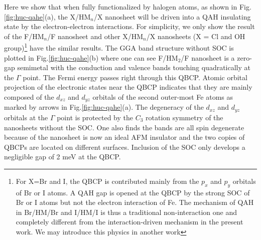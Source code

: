 \documentclass[twocolumn,english,prb,showpacs]{revtex4-1}
\begin{document}
Here we show that when fully functionalized by halogen atoms, as shown in Fig.\ref{fig:huc-qahe}(a), the {X/HM$_n$/X} nanosheet will be driven into a QAH insulating state by the electron-electron interactions. For simplicity, we only show the result of the F/HM$_n$/F nanosheet and other X/HM$_{n}$/X nanosheets (X = Cl and OH group)\footnote{For X=Br and I, the QBCP is contributed mainly from the $p_x$ and $p_y$ orbitals of Br or I atoms. A QAH gap is opened at the QBCP by the strong SOC of Br or I atoms but not the electron interaction of Fe. The mechanism of QAH in Br/HM/Br and I/HM/I is thus a traditional non-interaction one and completely different from the interaction-driven mechanism in the present work. We may introduce this physics in another work} {have the similar results}. The GGA band structure without SOC is plotted in Fig.\ref{fig:huc-qahe}(b) where one can see F/HM$_2$/F nanosheet is a zero-gap {semimetal} with the conduction and valence bands touching quadratically at the $\Gamma$ point. The Fermi energy passes right through this QBCP. Atomic orbital projection of the electronic states near the QBCP indicates that they are mainly composed of the $d_{xz}$ and $d_{yz}$ orbitals of the second outer-most Fe atoms as marked by arrows in Fig.\ref{fig:huc-qahe}(a). The degeneracy of the $d_{xz}$ and $d_{yz}$ orbitals at the $\Gamma$ point is protected by the  $C_3$ rotation symmetry of the nanosheets\cite{Liang2016Top} without the SOC. One also finds the bands are all spin degenerate because of the nanosheet is now an ideal AFM insulator and the two copies of QBCPs are located on different surfaces. Inclusion of the SOC only develops a negligible gap of 2 meV at the QBCP.
\end{document}
